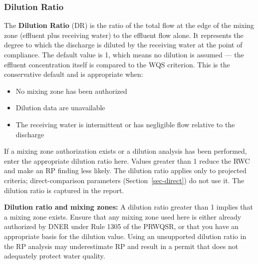 \documentclass[
  11pt,
  letterpaper,
  DIV=11,
  numbers=noendperiod]{scrartcl}
\providecommand{\tightlist}{%
  \setlength{\itemsep}{0pt}\setlength{\parskip}{0pt}}
\begin{document}
\subsubsection{Dilution Ratio}\label{sec-dilution-ratio}

The \textbf{Dilution Ratio} (DR) is the ratio of the total flow at the
edge of the mixing zone (effluent plus receiving water) to the effluent
flow alone. It represents the degree to which the discharge is diluted
by the receiving water at the point of compliance. The default value is
1, which means no dilution is assumed --- the effluent concentration
itself is compared to the WQS criterion. This is the conservative
default and is appropriate when:

\begin{itemize}
\tightlist
\item
  No mixing zone has been authorized
\item
  Dilution data are unavailable
\item
  The receiving water is intermittent or has negligible flow relative to
  the discharge
\end{itemize}

If a mixing zone authorization exists or a dilution analysis has been
performed, enter the appropriate dilution ratio here. Values greater
than 1 reduce the RWC and make an RP finding less likely. The dilution
ratio applies only to projected criteria; direct-comparison parameters
(Section~\ref{sec-direct}) do not use it. The dilution ratio is captured
in the report.

\begin{tcolorbox}[enhanced jigsaw, arc=.35mm, bottomrule=.15mm, bottomtitle=1mm, breakable, colback=white, colbacktitle=quarto-callout-warning-color!10!white, colframe=quarto-callout-warning-color-frame, coltitle=black, left=2mm, leftrule=.75mm, opacityback=0, opacitybacktitle=0.6, rightrule=.15mm, title=\textcolor{quarto-callout-warning-color}{\faExclamationTriangle}\hspace{0.5em}{Warning}, titlerule=0mm, toprule=.15mm, toptitle=1mm]

\textbf{Dilution ratio and mixing zones:} A dilution ratio greater than
1 implies that a mixing zone exists. Ensure that any mixing zone used
here is either already authorized by DNER under Rule 1305 of the PRWQSR,
or that you have an appropriate basis for the dilution value. Using an
unsupported dilution ratio in the RP analysis may underestimate RP and
result in a permit that does not adequately protect water quality.

\end{tcolorbox}
\end{document}
